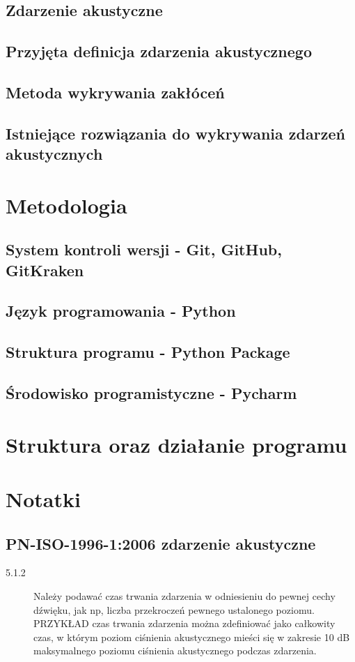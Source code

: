 \documentclass[12pt,a4paper]{article}
\begin{document}
\subsection{Zdarzenie akustyczne}
\subsection{Przyjęta definicja zdarzenia akustycznego}
\subsection{Metoda wykrywania zakłóceń}
\subsection{Istniejące rozwiązania do wykrywania zdarzeń akustycznych}
\section{Metodologia}
\subsection{System kontroli wersji - Git, GitHub, GitKraken}
\subsection{Język programowania - Python}
\subsection{Struktura programu - Python Package}
\subsection{Środowisko programistyczne - Pycharm}
\section{Struktura oraz działanie programu}

\section{Notatki}
\subsection{PN-ISO-1996-1:2006 zdarzenie akustyczne}
\begin{description}
\item[5.1.2] Należy podawać czas trwania zdarzenia w odniesieniu do pewnej cechy dźwięku, jak np, liczba przekroczeń pewnego ustalonego poziomu. 
PRZYKŁAD czas trwania zdarzenia można zdefiniować jako całkowity czas, w którym poziom ciśnienia akustycznego mieści się w zakresie 10 dB maksymalnego poziomu ciśnienia akustycznego podczas zdarzenia. 
\end{description}
\end{document}
